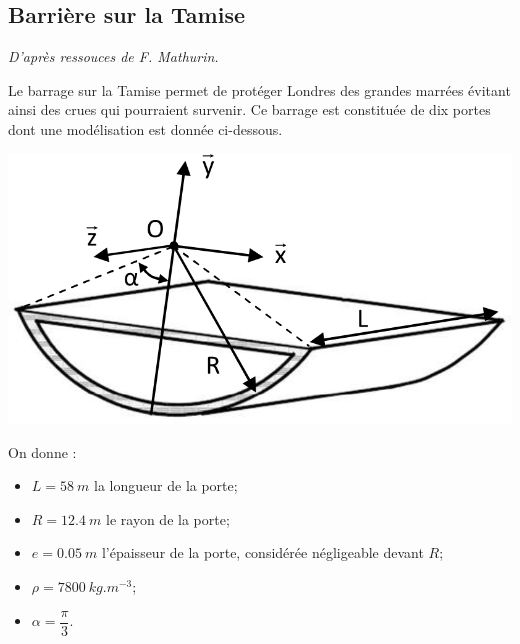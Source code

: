 \documentclass[10pt,fleqn]{article} %
\begin{document}
\def\pathfig{images}

\vspace{5cm}
\pagestyle{fancy}
\thispagestyle{plain}

\def\columnseprulecolor{\color{ocre}}
\setlength{\columnseprule}{0.4pt} 

\def\pathfig{images}

\ifprof
\else
\begin{multicols}{2}
\fi
\section*{Barrière sur la Tamise}
\textit{D'après ressouces de F. Mathurin.}

Le barrage sur la Tamise permet de protéger Londres des grandes marrées évitant ainsi des crues qui pourraient survenir. Ce barrage est constituée de dix portes dont une modélisation est donnée ci-dessous.

\begin{center}
\includegraphics[width=\linewidth]{images/fig_01}
\end{center}

On donne :
\begin{itemize}
\item $L=\SI{58}{m}$ la longueur de la porte;
\item $R=\SI{12,4}{m}$ le rayon de la porte;
\item $e=\SI{0,05}{m}$ l'épaisseur de la porte, considérée négligeable devant $R$;
\item $\rho=\SI{7800}{kg.m^{-3}}$;
\item $\alpha=\dfrac{\pi}{3}$.
\end{itemize}



\end{multicols}
\end{document}
